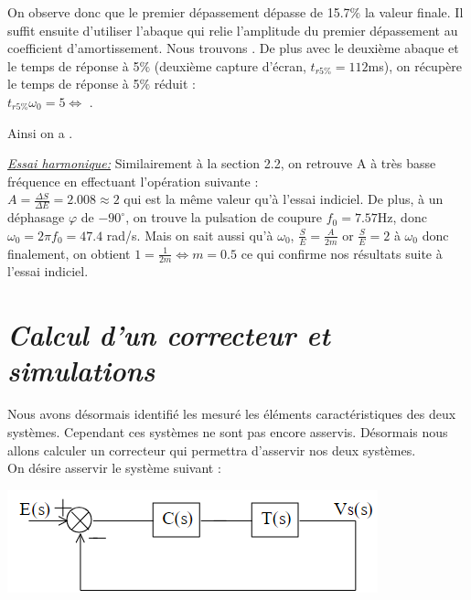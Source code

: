 \documentclass[12pt]{article}
\begin{document}
On observe donc que le premier dépassement dépasse de 15.7$\%$ la valeur finale. Il suffit ensuite d'utiliser l'abaque qui relie l'amplitude du premier dépassement au coefficient d'amortissement. Nous trouvons .
De plus avec le deuxième abaque et le temps de réponse à 5$\%$ (deuxième capture d'écran, $t_{r5\%} = 112$ms), on récupère le temps de réponse à 5$\%$ réduit :
\\ $t_{r5\%}\omega_0 = 5 \Leftrightarrow $ .
\begin{center}
    Ainsi on a .

\end{center}

\underline{\itshape Essai harmonique:} Similairement à la section 2.2, on retrouve A à très basse fréquence en effectuant l'opération suivante :
\\$A = \frac{\Delta S}{\Delta E} = 2.008 \approx 2$ qui est la même valeur qu'à l'essai indiciel. De plus, à un déphasage $\varphi$ de $-90^\circ$, on trouve la pulsation de coupure $f_0 = 7.57$Hz, donc $\omega_0 = 2\pi f_0 = 47.4$ rad/s.
Mais on sait aussi qu'à $\omega_0$, $\frac{S}{E} = \frac{A}{2m}$ or $\frac{S}{E} = 2$ à $\omega_0$ donc finalement, on obtient $1 = \frac{1}{2m} \Leftrightarrow m = 0.5$ ce qui confirme nos résultats suite à l'essai indiciel.

\newpage

\section{\itshape Calcul d'un correcteur et simulations}

Nous avons désormais identifié les mesuré les éléments caractéristiques des deux systèmes. Cependant ces systèmes ne sont pas encore asservis. Désormais nous allons calculer un correcteur qui permettra d'asservir nos deux systèmes.
\\On désire asservir le système suivant : 
\begin{center}
    \includegraphics{TP2 Simulink/syst_a_asservir.png}
\end{center}
\end{document}
